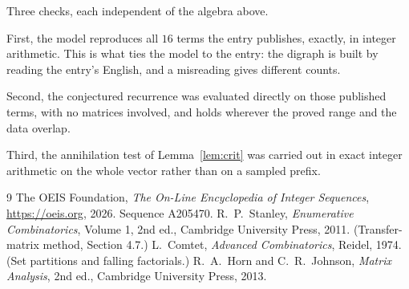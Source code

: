 \documentclass[11pt,a4paper]{article}
\theoremstyle{plain}
\theoremstyle{definition}
\begin{document}
Three checks, each independent of the algebra above.

First, the model reproduces all $16$ terms the entry publishes, exactly, in integer
arithmetic. This is what ties the model to the entry: the digraph is built by reading the
entry's English, and a misreading gives different counts.

Second, the conjectured recurrence was evaluated directly on those published terms, with no
matrices involved, and holds wherever the proved range and the data overlap.

Third, the annihilation test of Lemma~\ref{lem:crit} was carried out in exact integer
arithmetic on the whole vector rather than on a sampled prefix.

\begin{thebibliography}{9}
 The OEIS Foundation, \emph{The On-Line Encyclopedia of Integer
Sequences}, \url{https://oeis.org}, 2026. Sequence A205470.
 R.~P.~Stanley, \emph{Enumerative Combinatorics}, Volume 1, 2nd ed.,
Cambridge University Press, 2011. (Transfer-matrix method, Section 4.7.)
 L.~Comtet, \emph{Advanced Combinatorics}, Reidel, 1974. (Set partitions
and falling factorials.)
 R.~A.~Horn and C.~R.~Johnson, \emph{Matrix Analysis}, 2nd ed., Cambridge
University Press, 2013.
\end{thebibliography}
\end{document}
